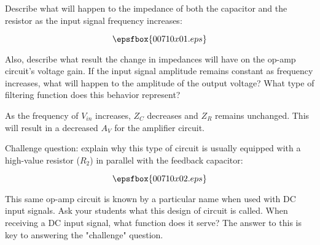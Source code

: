 

Describe what will happen to the impedance of both the capacitor and the resistor as the input signal frequency increases:

$$\epsfbox{00710x01.eps}$$

Also, describe what result the change in impedances will have on the op-amp circuit's voltage gain.  If the input signal amplitude remains constant as frequency increases, what will happen to the amplitude of the output voltage?  What type of filtering function does this behavior represent?







As the frequency of $V_{in}$ increases, $Z_C$ decreases and $Z_R$ remains unchanged.  This will result in a decreased $A_V$ for the amplifier circuit.

\vskip 10pt

Challenge question: explain why this type of circuit is usually equipped with a high-value resistor ($R_2$) in parallel with the feedback capacitor:

$$\epsfbox{00710x02.eps}$$







This same op-amp circuit is known by a particular name when used with DC input signals.  Ask your students what this design of circuit is called.  When receiving a DC input signal, what function does it serve?  The answer to this is key to answering the "challenge" question.  



